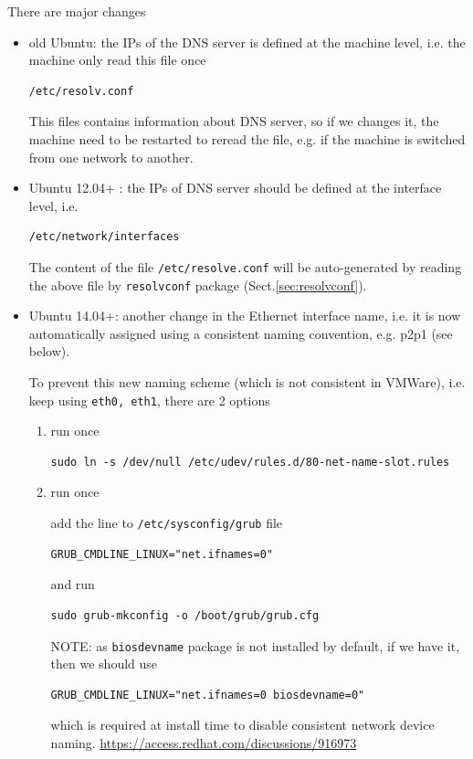 There are major changes
\begin{itemize}

  \item old Ubuntu: the IPs of the DNS server is defined at the machine level,
  i.e. the machine only read this file once
\begin{verbatim}
/etc/resolv.conf
\end{verbatim}  
  
This files contains information about DNS server, so if we changes it,
the machine need to be restarted to reread the file, e.g. if the
machine is switched from one network to another.

  \item Ubuntu 12.04+ : the IPs of DNS server should be defined at the
  interface level, i.e. 
\begin{verbatim}
/etc/network/interfaces
\end{verbatim}  
The content of the file \verb!/etc/resolve.conf! will be auto-generated by
reading the above file 
by \verb!resolvconf! package (Sect.\ref{sec:resolvconf}).

  
  \item Ubuntu 14.04+: another change in the Ethernet interface name, i.e. it is
  now automatically assigned using a consistent naming convention, e.g. p2p1
  (see below).
  
  To prevent this new naming scheme (which is not consistent in VMWare), i.e.
  keep using \verb!eth0, eth1!, there are 2 options
\begin{enumerate}
  \item run once
\begin{verbatim}
sudo ln -s /dev/null /etc/udev/rules.d/80-net-name-slot.rules
\end{verbatim}


  \item run once

add the line to \verb!/etc/sysconfig/grub! file  
\begin{verbatim}
GRUB_CMDLINE_LINUX="net.ifnames=0"
\end{verbatim}
and run
\begin{verbatim}
sudo grub-mkconfig -o /boot/grub/grub.cfg
\end{verbatim}

NOTE: as \verb!biosdevname! package is not installed by default, if we have it,
then we should use
\begin{verbatim}
GRUB_CMDLINE_LINUX="net.ifnames=0 biosdevname=0"
\end{verbatim}
which is required at install time to disable consistent network device naming.
\url{https://access.redhat.com/discussions/916973}




\end{enumerate}
\end{itemize}
